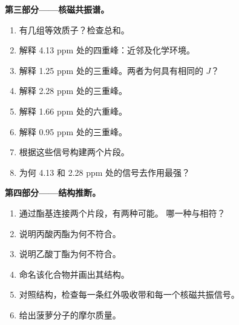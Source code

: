 \begin{problem}
\medskip
\noindent\textbf{第三部分——核磁共振谱。}
\begin{enumerate}[resume]
  \item 有几组等效质子？检查总和。
  \item 解释 4.13 ppm 处的四重峰：近邻及化学环境。
  \item 解释 1.25 ppm 处的三重峰。两者为何具有相同的
        $J$？
  \item 解释 2.28 ppm 处的三重峰。
  \item 解释 1.66 ppm 处的六重峰。
  \item 解释 0.95 ppm 处的三重峰。
  \item 根据这些信号构建两个片段。
  \item 为何 4.13 和 2.28 ppm 处的信号去作用最强？
\end{enumerate}

\medskip
\noindent\textbf{第四部分——结构推断。}
\begin{enumerate}[resume]
  \item 通过酯基连接两个片段，有两种可能。
        哪一种与相符？
  \item 说明丙酸丙酯为何不符合。
  \item 说明乙酸丁酯为何不符合。
  \item 命名该化合物并画出其结构。
  \item 对照结构，检查每一条红外吸收带和每一个核磁共振信号。
  \item 给出菠萝分子的摩尔质量。
\end{enumerate}
\end{problem}
